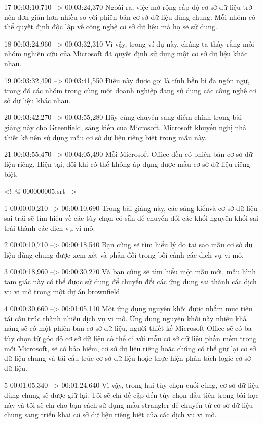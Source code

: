 17
00:03:10,710 --> 00:03:24,370
Ngoài ra, việc mở rộng cấp độ cơ sở dữ liệu trở nên đơn giản hơn nhiều so với phiên bản cơ sở dữ liệu dùng chung.  Mỗi nhóm có thể quyết định độc lập về công nghệ cơ sở dữ liệu mà họ sẽ sử dụng.

18
00:03:24,960 --> 00:03:32,310
Vì vậy, trong ví dụ này, chúng ta thấy rằng mỗi nhóm nghiên cứu của Microsoft đã quyết định sử dụng một cơ sở dữ liệu khác nhau.

19
00:03:32,490 --> 00:03:41,550
Điều này được gọi là tính bền bỉ đa ngôn ngữ, trong đó các nhóm trong cùng một doanh nghiệp đang sử dụng các công nghệ cơ sở dữ liệu khác nhau.

20
00:03:42,270 --> 00:03:55,280
Hãy cùng chuyển sang điểm chính trong bài giảng này cho Greenfield, sáng kiến ​​của Microsoft.  Microsoft khuyến nghị nhà thiết kế nên sử dụng mẫu cơ sở dữ liệu riêng biệt trong mẫu này.

21
00:03:55,470 --> 00:04:05,490
Mỗi Microsoft Office đều có phiên bản cơ sở dữ liệu riêng.  Hiện tại, đôi khi có thể không áp dụng được mẫu cơ sở dữ liệu riêng biệt.

<!--@ 000000005.srt -->

1
00:00:00,210 --> 00:00:10,690
Trong bài giảng này, các sáng kiến ​​và cơ sở dữ liệu sai trái sẽ tìm hiểu về các tùy chọn có sẵn để chuyển đổi các khối nguyên khối sai trái thành các dịch vụ vi mô.

2
00:00:10,710 --> 00:00:18,540
Bạn cũng sẽ tìm hiểu lý do tại sao mẫu cơ sở dữ liệu dùng chung được xem xét và phản đối trong bối cảnh các dịch vụ vi mô.

3
00:00:18,960 --> 00:00:30,270
Và bạn cũng sẽ tìm hiểu một mẫu mới, mẫu hình tam giác này có thể được sử dụng để chuyển đổi các ứng dụng sai thành các dịch vụ vi mô trong một dự án brownfield.

4
00:00:30,660 --> 00:01:05,110
Một ứng dụng nguyên khối được nhắm mục tiêu tái cấu trúc thành nhiều dịch vụ vi mô.  Ứng dụng nguyên khối này nhiều khả năng sẽ có một phiên bản cơ sở dữ liệu, người thiết kế Microsoft Office sẽ có ba tùy chọn từ góc độ cơ sở dữ liệu có thể đi với mẫu cơ sở dữ liệu phần mềm trong mỗi Microsoft, sẽ có bảo hiểm, cơ sở dữ liệu riêng hoặc chúng  có thể giữ lại cơ sở dữ liệu chung và tái cấu trúc cơ sở dữ liệu hoặc thực hiện phân tách logic cơ sở dữ liệu.

5
00:01:05,340 --> 00:01:24,640
Vì vậy, trong hai tùy chọn cuối cùng, cơ sở dữ liệu dùng chung sẽ được giữ lại.  Tôi sẽ chỉ đề cập đến tùy chọn đầu tiên trong bài học này và tôi sẽ chỉ cho bạn cách sử dụng mẫu strangler để chuyển từ cơ sở dữ liệu chung sang triển khai cơ sở dữ liệu riêng biệt của các dịch vụ vi mô.

